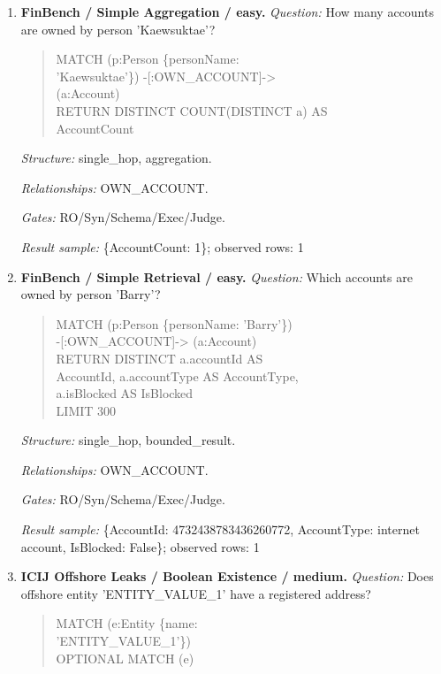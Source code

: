 \begin{enumerate}
\textit{Result sample:} \{AccountId: 4732438783436260772, AccountType: internet account, IsBlocked: False\}; observed rows: 1
\item \textbf{FinBench / Simple Aggregation / easy.}
\textit{Question:} How many accounts are owned by person 'Kaewsuktae'?
\begin{quote}\scriptsize\ttfamily\raggedright\sloppy
MATCH (p:Person \{personName:\\
'Kaewsuktae'\}) -[:OWN\_ACCOUNT]-\textgreater{}\\
(a:Account)\\
RETURN DISTINCT COUNT(DISTINCT a) AS\\
AccountCount
\end{quote}
\textit{Structure:} single\_hop, aggregation.\par
\textit{Relationships:} OWN\_ACCOUNT.\par
\textit{Gates:} RO/Syn/Schema/Exec/Judge.\par
\textit{Result sample:} \{AccountCount: 1\}; observed rows: 1
\item \textbf{FinBench / Simple Retrieval / easy.}
\textit{Question:} Which accounts are owned by person 'Barry'?
\begin{quote}\scriptsize\ttfamily\raggedright\sloppy
MATCH (p:Person \{personName: 'Barry'\})\\
-[:OWN\_ACCOUNT]-\textgreater{} (a:Account)\\
RETURN DISTINCT a.accountId AS\\
AccountId, a.accountType AS AccountType,\\
a.isBlocked AS IsBlocked\\
LIMIT 300
\end{quote}
\textit{Structure:} single\_hop, bounded\_result.\par
\textit{Relationships:} OWN\_ACCOUNT.\par
\textit{Gates:} RO/Syn/Schema/Exec/Judge.\par
\textit{Result sample:} \{AccountId: 4732438783436260772, AccountType: internet account, IsBlocked: False\}; observed rows: 1
\item \textbf{ICIJ Offshore Leaks / Boolean Existence / medium.}
\textit{Question:} Does offshore entity 'ENTITY\_VALUE\_1' have a registered address?
\begin{quote}\scriptsize\ttfamily\raggedright\sloppy
MATCH (e:Entity \{name:\\
'ENTITY\_VALUE\_1'\})\\
OPTIONAL MATCH (e)\\

\end{quote}
\end{enumerate}
